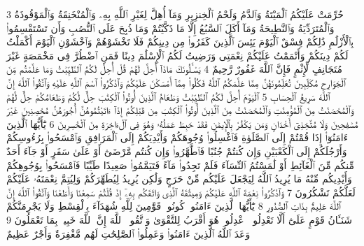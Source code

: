{\tiny\colorbox{cl_aya}{3}} حُرِّمَتْ عَلَيْكُمُ ٱلْمَيْتَةُ وَٱلدَّمُ وَلَحْمُ ٱلْخِنزِيرِ وَمَآ أُهِلَّ لِغَيْرِ ٱللَّهِ بِهِۦ وَٱلْمُنْخَنِقَةُ وَٱلْمَوْقُوذَةُ وَٱلْمُتَرَدِّيَةُ وَٱلنَّطِيحَةُ وَمَآ أَكَلَ ٱلسَّبُعُ إِلَّا مَا ذَكَّيْتُمْ وَمَا ذُبِحَ عَلَى ٱلنُّصُبِ وَأَن تَسْتَقْسِمُوا۟ بِٱلْأَزْلَٰمِ ذَٰلِكُمْ فِسْقٌ ٱلْيَوْمَ يَئِسَ ٱلَّذِينَ كَفَرُوا۟ مِن دِينِكُمْ فَلَا تَخْشَوْهُمْ وَٱخْشَوْنِ ٱلْيَوْمَ أَكْمَلْتُ لَكُمْ دِينَكُمْ وَأَتْمَمْتُ عَلَيْكُمْ نِعْمَتِى وَرَضِيتُ لَكُمُ ٱلْإِسْلَٰمَ دِينًا فَمَنِ ٱضْطُرَّ فِى مَخْمَصَةٍ غَيْرَ مُتَجَانِفٍ لِّإِثْمٍ فَإِنَّ ٱللَّهَ غَفُورٌ رَّحِيمٌ
{\tiny\colorbox{cl_aya}{4}} يَسْـَٔلُونَكَ مَاذَآ أُحِلَّ لَهُمْ قُلْ أُحِلَّ لَكُمُ ٱلطَّيِّبَٰتُ وَمَا عَلَّمْتُم مِّنَ ٱلْجَوَارِحِ مُكَلِّبِينَ تُعَلِّمُونَهُنَّ مِمَّا عَلَّمَكُمُ ٱللَّهُ فَكُلُوا۟ مِمَّآ أَمْسَكْنَ عَلَيْكُمْ وَٱذْكُرُوا۟ ٱسْمَ ٱللَّهِ عَلَيْهِ وَٱتَّقُوا۟ ٱللَّهَ إِنَّ ٱللَّهَ سَرِيعُ ٱلْحِسَابِ
{\tiny\colorbox{cl_aya}{5}} ٱلْيَوْمَ أُحِلَّ لَكُمُ ٱلطَّيِّبَٰتُ وَطَعَامُ ٱلَّذِينَ أُوتُوا۟ ٱلْكِتَٰبَ حِلٌّ لَّكُمْ وَطَعَامُكُمْ حِلٌّ لَّهُمْ وَٱلْمُحْصَنَٰتُ مِنَ ٱلْمُؤْمِنَٰتِ وَٱلْمُحْصَنَٰتُ مِنَ ٱلَّذِينَ أُوتُوا۟ ٱلْكِتَٰبَ مِن قَبْلِكُمْ إِذَآ ءَاتَيْتُمُوهُنَّ أُجُورَهُنَّ مُحْصِنِينَ غَيْرَ مُسَٰفِحِينَ وَلَا مُتَّخِذِىٓ أَخْدَانٍ وَمَن يَكْفُرْ بِٱلْإِيمَٰنِ فَقَدْ حَبِطَ عَمَلُهُۥ وَهُوَ فِى ٱلْءَاخِرَةِ مِنَ ٱلْخَٰسِرِينَ
{\tiny\colorbox{cl_aya}{6}} يَٰٓأَيُّهَا ٱلَّذِينَ ءَامَنُوٓا۟ إِذَا قُمْتُمْ إِلَى ٱلصَّلَوٰةِ فَٱغْسِلُوا۟ وُجُوهَكُمْ وَأَيْدِيَكُمْ إِلَى ٱلْمَرَافِقِ وَٱمْسَحُوا۟ بِرُءُوسِكُمْ وَأَرْجُلَكُمْ إِلَى ٱلْكَعْبَيْنِ وَإِن كُنتُمْ جُنُبًا فَٱطَّهَّرُوا۟ وَإِن كُنتُم مَّرْضَىٰٓ أَوْ عَلَىٰ سَفَرٍ أَوْ جَآءَ أَحَدٌ مِّنكُم مِّنَ ٱلْغَآئِطِ أَوْ لَٰمَسْتُمُ ٱلنِّسَآءَ فَلَمْ تَجِدُوا۟ مَآءً فَتَيَمَّمُوا۟ صَعِيدًا طَيِّبًا فَٱمْسَحُوا۟ بِوُجُوهِكُمْ وَأَيْدِيكُم مِّنْهُ مَا يُرِيدُ ٱللَّهُ لِيَجْعَلَ عَلَيْكُم مِّنْ حَرَجٍ وَلَٰكِن يُرِيدُ لِيُطَهِّرَكُمْ وَلِيُتِمَّ نِعْمَتَهُۥ عَلَيْكُمْ لَعَلَّكُمْ تَشْكُرُونَ
{\tiny\colorbox{cl_aya}{7}} وَٱذْكُرُوا۟ نِعْمَةَ ٱللَّهِ عَلَيْكُمْ وَمِيثَٰقَهُ ٱلَّذِى وَاثَقَكُم بِهِۦٓ إِذْ قُلْتُمْ سَمِعْنَا وَأَطَعْنَا وَٱتَّقُوا۟ ٱللَّهَ إِنَّ ٱللَّهَ عَلِيمٌۢ بِذَاتِ ٱلصُّدُورِ
{\tiny\colorbox{cl_aya}{8}} يَٰٓأَيُّهَا ٱلَّذِينَ ءَامَنُوا۟ كُونُوا۟ قَوَّٰمِينَ لِلَّهِ شُهَدَآءَ بِٱلْقِسْطِ وَلَا يَجْرِمَنَّكُمْ شَنَـَٔانُ قَوْمٍ عَلَىٰٓ أَلَّا تَعْدِلُوا۟ ٱعْدِلُوا۟ هُوَ أَقْرَبُ لِلتَّقْوَىٰ وَٱتَّقُوا۟ ٱللَّهَ إِنَّ ٱللَّهَ خَبِيرٌۢ بِمَا تَعْمَلُونَ
{\tiny\colorbox{cl_aya}{9}} وَعَدَ ٱللَّهُ ٱلَّذِينَ ءَامَنُوا۟ وَعَمِلُوا۟ ٱلصَّٰلِحَٰتِ لَهُم مَّغْفِرَةٌ وَأَجْرٌ عَظِيمٌ
